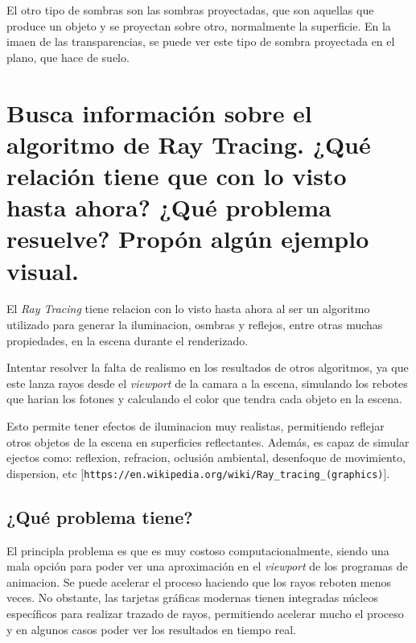 \documentclass{article}
\begin{document}

El otro tipo de sombras son las sombras proyectadas, que son aquellas que produce un objeto y se proyectan sobre otro, normalmente la superficie. En la imaen de las transparencias, se puede ver este tipo de sombra proyectada en el plano, que hace de suelo.


\section{Busca información sobre el algoritmo de Ray Tracing. ¿Qué relación tiene que con lo visto hasta ahora? ¿Qué problema resuelve? Propón algún ejemplo visual.}

El \textit{Ray Tracing} tiene relacion con lo visto hasta ahora al ser un algoritmo utilizado para generar la iluminacion, osmbras y reflejos, entre otras muchas propiedades, en la escena durante el renderizado.

Intentar resolver la falta de realismo en los resultados de otros algoritmos, ya que este lanza rayos desde el \textit{viewport} de la camara a la escena, simulando los rebotes que harian los fotones y calculando el color que tendra cada objeto en la escena. 

Esto permite tener efectos de iluminacion muy realistas, permitiendo reflejar otros objetos de la escena en superficies reflectantes. Además, es capaz de simular ejectos como: reflexion, refracion, oclusión ambiental, desenfoque de movimiento, dispersion, etc [\verb|https://en.wikipedia.org/wiki/Ray_tracing_(graphics)|].


\subsection{¿Qué problema tiene?}

El principla problema es que es muy costoso computacionalmente, siendo una mala opción para poder ver una aproximación en el \textit{viewport} de los programas de animacion. Se puede acelerar el proceso haciendo que los rayos reboten menos veces. No obstante, las tarjetas gráficas modernas tienen integradas núcleos específicos para realizar trazado de rayos, permitiendo acelerar mucho el proceso y en algunos casos poder ver los resultados en tiempo real.
\end{document}
